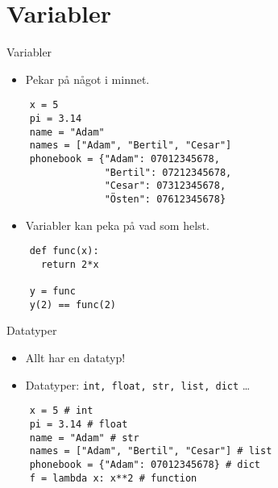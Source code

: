 \mode*

\section{Variabler}

\begin{frame}[fragile]
  \begin{block}{Variabler}
    \begin{itemize}
      \item Pekar på något i minnet.
    \end{itemize}
  \end{block}
  \begin{verbatim}
    x = 5
    pi = 3.14
    name = "Adam"
    names = ["Adam", "Bertil", "Cesar"]
    phonebook = {"Adam": 07012345678,
                 "Bertil": 07212345678,
                 "Cesar": 07312345678,
                 "Östen": 07612345678}
  \end{verbatim}
\end{frame}

\begin{frame}[fragile]
  \begin{remark}
    \begin{itemize}
      \item Variabler kan peka på vad som helst.
    \end{itemize}
  \end{remark}

  \begin{verbatim}
    def func(x):
      return 2*x

    y = func
    y(2) == func(2)
  \end{verbatim}
\end{frame}

\begin{frame}[fragile]
  \begin{block}{Datatyper}
    \begin{itemize}
      \item Allt har en datatyp!
      \item Datatyper: \texttt{int, float, str, list, dict} \dots
    \end{itemize}
  \end{block}

  \begin{verbatim}
    x = 5 # int
    pi = 3.14 # float
    name = "Adam" # str
    names = ["Adam", "Bertil", "Cesar"] # list
    phonebook = {"Adam": 07012345678} # dict
    f = lambda x: x**2 # function
  \end{verbatim}
\end{frame}

